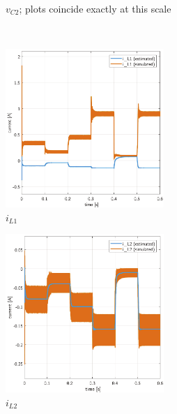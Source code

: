 \begin{figure}[H]
\begin{framed}
\begin{subfigure}[b]{0.45\textwidth}
    \caption{$v_{C2}$; plots coincide exactly at this scale}
    \label{}
    \end{subfigure}
    \\[11pt]
    \begin{subfigure}[b]{0.45\textwidth}
    \centering
    \includegraphics[height = 6cm]{figures/estimation/iL1_iL1.pdf}
    \caption{$i_{L1}$}
    \label{}
    \end{subfigure}
    \hfill
    \begin{subfigure}[b]{0.45\textwidth}
    \centering
    \includegraphics[height = 6cm]{figures/estimation/iL2_iL2.pdf}
    \caption{$i_{L2}$}
    \label{fig:estimatinglast}
    \end{subfigure}
    \end{framed}
    \caption{}
    \label{fig:estimating}
\end{figure}

